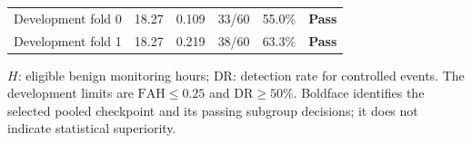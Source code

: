 \begin{table}[!t]
{\begin{tabularx}{\columnwidth}{@{}
>{\raggedright\arraybackslash}X
ccccc
@{}}
Development fold 0
& 18.27 & 0.109 & 33/60 & 55.0\% & \textbf{Pass} \\

Development fold 1
& 18.27 & 0.219 & 38/60 & 63.3\% & \textbf{Pass} \\

\bottomrule
\end{tabularx}
}

\vspace{2pt}
{\scriptsize\raggedright
\(H\): eligible benign monitoring hours; DR: detection rate for controlled events. The development limits are \(\mathrm{FAH}\leq0.25\) and \(\mathrm{DR}\geq50\%\). Boldface identifies the selected pooled checkpoint and its passing subgroup decisions; it does not indicate statistical superiority.
\par}
\end{table}
